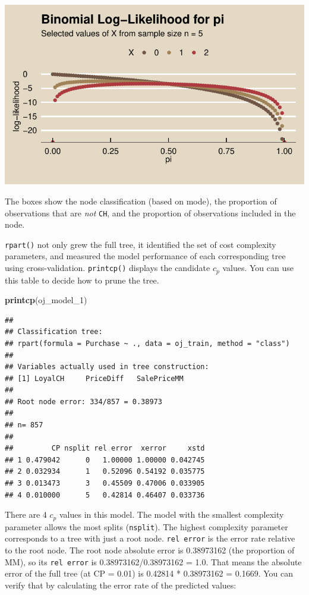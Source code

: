 \documentclass[
]{book}
\newenvironment{Shaded}{\begin{snugshade}}{\end{snugshade}}
\newcommand{\DecValTok}[1]{\textcolor[rgb]{0.00,0.00,0.81}{#1}}
\newcommand{\KeywordTok}[1]{\textcolor[rgb]{0.13,0.29,0.53}{\textbf{#1}}}
\newcommand{\NormalTok}[1]{#1}
\begin{document}
\includegraphics{data-sci_files/figure-latex/unnamed-chunk-29-1.pdf}

The boxes show the node classification (based on mode), the proportion of observations that are \emph{not} \texttt{CH}, and the proportion of observations included in the node.

\texttt{rpart()} not only grew the full tree, it identified the set of cost complexity parameters, and measured the model performance of each corresponding tree using cross-validation. \texttt{printcp()} displays the candidate \(c_p\) values. You can use this table to decide how to prune the tree.

\begin{Shaded}
\begin{Highlighting}[]
\KeywordTok{printcp}\NormalTok{(oj_model_}\DecValTok{1}\NormalTok{)}
\end{Highlighting}
\end{Shaded}

\begin{verbatim}
## 
## Classification tree:
## rpart(formula = Purchase ~ ., data = oj_train, method = "class")
## 
## Variables actually used in tree construction:
## [1] LoyalCH     PriceDiff   SalePriceMM
## 
## Root node error: 334/857 = 0.38973
## 
## n= 857 
## 
##         CP nsplit rel error  xerror     xstd
## 1 0.479042      0   1.00000 1.00000 0.042745
## 2 0.032934      1   0.52096 0.54192 0.035775
## 3 0.013473      3   0.45509 0.47006 0.033905
## 4 0.010000      5   0.42814 0.46407 0.033736
\end{verbatim}

There are 4 \(c_p\) values in this model. The model with the smallest complexity parameter allows the most splits (\texttt{nsplit}). The highest complexity parameter corresponds to a tree with just a root node. \texttt{rel\ error} is the error rate relative to the root node. The root node absolute error is 0.38973162 (the proportion of MM), so its \texttt{rel\ error} is 0.38973162/0.38973162 = 1.0. That means the absolute error of the full tree (at CP = 0.01) is 0.42814 * 0.38973162 = 0.1669. You can verify that by calculating the error rate of the predicted values:
\end{document}
